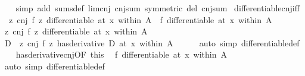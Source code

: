 \begin{isabellebody}
%
\isadelimproof
\ \ %
\endisadelimproof
%
\isatagproof
{}\isamarkupfalse%
\ {\isacharparenleft}{\kern0pt}simp\ add{\isacharcolon}{\kern0pt}\ sums{\isacharunderscore}{\kern0pt}def\ lim{\isacharunderscore}{\kern0pt}cnj\ cnj{\isacharunderscore}{\kern0pt}sum\ {\isacharbrackleft}{\kern0pt}symmetric{\isacharbrackright}{\kern0pt}\ del{\isacharcolon}{\kern0pt}\ cnj{\isacharunderscore}{\kern0pt}sum{\isacharparenright}{\kern0pt}%
\endisatagproof
{\isafoldproof}%
%
\isadelimproof
\isanewline
%
\endisadelimproof
\isanewline
{}\isamarkupfalse%
\ differentiable{\isacharunderscore}{\kern0pt}cnj{\isacharunderscore}{\kern0pt}iff{\isacharcolon}{\kern0pt}\isanewline
\ \ {\isachardoublequoteopen}{\isacharparenleft}{\kern0pt}{\isasymlambda}z{\isachardot}{\kern0pt}\ cnj\ {\isacharparenleft}{\kern0pt}f\ z{\isacharparenright}{\kern0pt}{\isacharparenright}{\kern0pt}\ differentiable\ at\ x\ within\ A\ {\isasymlongleftrightarrow}\ f\ differentiable\ at\ x\ within\ A{\isachardoublequoteclose}\isanewline
%
\isadelimproof
%
\endisadelimproof
%
\isatagproof
{}\isamarkupfalse%
\isanewline
\ \ \isamarkupfalse%
\ {\isachardoublequoteopen}{\isacharparenleft}{\kern0pt}{\isasymlambda}z{\isachardot}{\kern0pt}\ cnj\ {\isacharparenleft}{\kern0pt}f\ z{\isacharparenright}{\kern0pt}{\isacharparenright}{\kern0pt}\ differentiable\ at\ x\ within\ A{\isachardoublequoteclose}\isanewline
\ \ \isamarkupfalse%
\ \isamarkupfalse%
\ D\ \ {\isachardoublequoteopen}{\isacharparenleft}{\kern0pt}{\isacharparenleft}{\kern0pt}{\isasymlambda}z{\isachardot}{\kern0pt}\ cnj\ {\isacharparenleft}{\kern0pt}f\ z{\isacharparenright}{\kern0pt}{\isacharparenright}{\kern0pt}\ has{\isacharunderscore}{\kern0pt}derivative\ D{\isacharparenright}{\kern0pt}\ {\isacharparenleft}{\kern0pt}at\ x\ within\ A{\isacharparenright}{\kern0pt}{\isachardoublequoteclose}\isanewline
\ \ \ \ \isamarkupfalse%
\ {\isacharparenleft}{\kern0pt}auto\ simp{\isacharcolon}{\kern0pt}\ differentiable{\isacharunderscore}{\kern0pt}def{\isacharparenright}{\kern0pt}\isanewline
\ \ \isamarkupfalse%
\ has{\isacharunderscore}{\kern0pt}derivative{\isacharunderscore}{\kern0pt}cnj{\isacharbrackleft}{\kern0pt}OF\ this{\isacharbrackright}{\kern0pt}\ \isamarkupfalse%
\ {\isachardoublequoteopen}f\ differentiable\ at\ x\ within\ A{\isachardoublequoteclose}\isanewline
\ \ \ \ \isamarkupfalse%
\ {\isacharparenleft}{\kern0pt}auto\ simp{\isacharcolon}{\kern0pt}\ differentiable{\isacharunderscore}{\kern0pt}def{\isacharparenright}{\kern0pt}\isanewline

\end{isabellebody}
